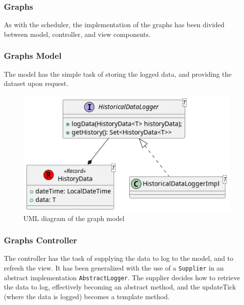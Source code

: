 \subsubsection{Graphs}

As with the scheduler, the implementation of the graphs has been divided between model, controller, and view components.

\subsubsection{Graphs Model}

The model has the simple task of storing the logged data, and providing the dataset upon request.

\begin{figure}[H]
\centering{}
\includegraphics[width=\textwidth,height=\textheight,keepaspectratio]{magnani/uml/graph-model.png}
\caption{UML diagram of the graph model}
\label{magnani:uml:graph-model}
\end{figure}

\subsubsection{Graphs Controller}

The controller has the task of supplying the data to log to the model, and to refresh the view.
It has been generalized with the use of a \texttt{Supplier} in an abstract implementation \texttt{AbstractLogger}. \newline
The supplier decides how to retrieve the data to log, effectively becoming an abstract method, and the updateTick (where the data is logged)
becomes a template method.


